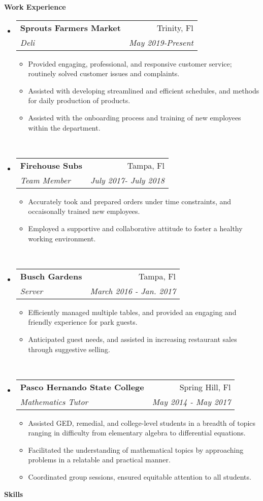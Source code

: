 \documentclass[letterpaper, 10pt]{article}
\makeatletter
\newcommand{\resitem}[1]{\item #1 \vspace{-2pt}}
\newcommand{\resheading}[1]{{\large \colorbox{mywhite}{\begin{minipage}{\dimexpr\textwidth-2\fboxsep}
    {\textbf{#1 \vphantom{p\^{E}}}}\end{minipage}}}}
\newcommand{\ressubheading}[4]{
    \begin{tabular*}{\linewidth}{l@{\extracolsep{\fill}}r}
        \textbf{#1} & #2 \\
        \textit{#3} & \textit{#4} \\
    \end{tabular*}\vspace{-6pt}
}
\makeatother
\begin{document}
\resheading{Work Experience}
\begin{itemize}
\item
    \ressubheading{Sprouts Farmers Market}{Trinity, Fl}{Deli}{May 2019-Present}
    \begin{itemize}
        \resitem{Provided engaging, professional, and responsive customer service; routinely
            solved customer issues and complaints.}
        \resitem{Assisted with developing streamlined and efficient schedules, and methods 
            for daily production of products.}
            \resitem{Assisted with the onboarding process and training of new employees within 
            the department.}
    \end{itemize}
\ \\
\item
    \ressubheading{Firehouse Subs}{Tampa, Fl}{Team Member}{July 2017- July 2018}
    \begin{itemize}
        \resitem{Accurately took and prepared orders under time constraints, and occaisonally
        trained new employees.}
        \resitem{Employed a supportive and collaborative attitude to foster a healthy working environment.}
    \end{itemize}
\ \\
\item 
    \ressubheading{Busch Gardens}{Tampa, Fl}{Server}{March 2016 - Jan. 2017}
    \begin{itemize}
        \resitem{Efficiently managed multiple tables, and provided an engaging and friendly 
            experience for park guests.} 
        \resitem{Anticipated guest needs, and assisted in increasing restaurant sales through
            suggestive selling.}
    \end{itemize}
\ \\
\item
    \ressubheading{Pasco Hernando State College}{Spring Hill, Fl}{Mathematics Tutor}{May 2014 - May 2017}
    \begin{itemize}
        \resitem{Assisted GED, remedial, and college-level students in a breadth of topics ranging in difficulty from elementary algebra to differential equations.}
        \resitem{Facilitated the understanding of mathematical topics by approaching problems in a relatable and practical manner.}
        \resitem{Coordinated group sessions, ensured equitable attention to all students.}
    \end{itemize}
\end{itemize}
\resheading{Skills}
    
\end{document}
